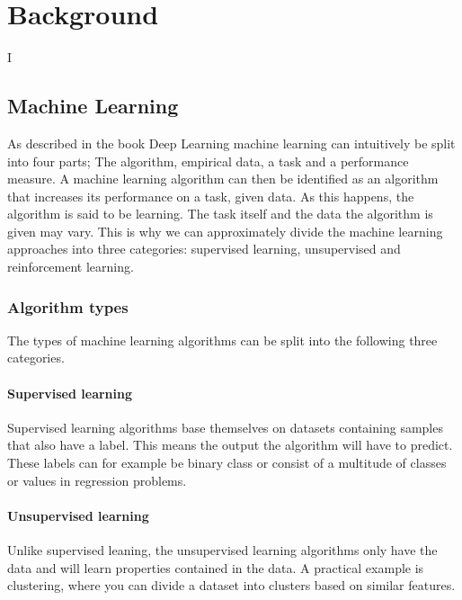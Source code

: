 \chapter{Background}
    I 
    
\section{Machine Learning} \label{Machine Learning}
    As described in the book Deep Learning\cite{Goodfellow-et-al-2016_ML} machine learning can intuitively be split into four parts; The algorithm, empirical data, a task and a performance measure. A machine learning algorithm can then be identified as an algorithm that increases its performance on a task, given data. As this happens, the algorithm is said to be learning. The task itself and the data the algorithm is given may vary. This is why we can approximately divide the machine learning approaches into three categories\cite{Goodfellow-et-al-2016_E}: supervised learning, unsupervised and reinforcement learning. 
    
    \subsection{Algorithm types} \label{Algorithm types}
        The types of machine learning algorithms can be split into the following three categories.
        
        \subsubsection{Supervised learning}
            Supervised learning \cite{Goodfellow-et-al-2016_E} algorithms base themselves on datasets containing samples that also have a label. This means the output the algorithm will have to predict. These labels can for example be binary class or consist of a multitude of classes or values in regression problems. 
            
        \subsubsection{Unsupervised learning}
            Unlike supervised leaning, the unsupervised learning \cite{Goodfellow-et-al-2016_E} algorithms only have the data and will learn properties contained in the data. A practical example is clustering, where you can divide a dataset into clusters based on similar features. 
                
